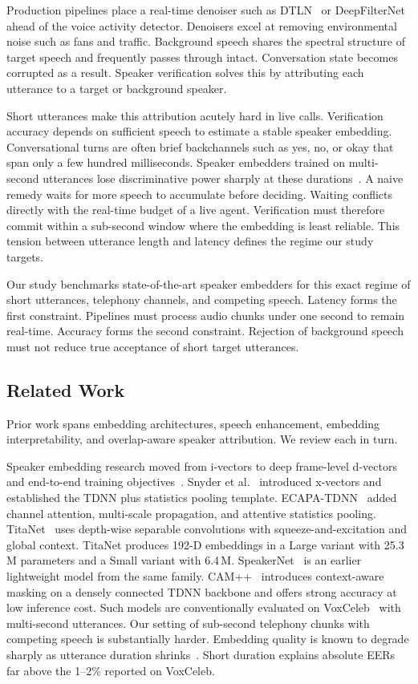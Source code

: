 \documentclass{llncs}
\begin{document}
Production pipelines place a real-time denoiser such as DTLN~\cite{dtln} or DeepFilterNet~\cite{dfn} ahead of the voice activity detector. Denoisers excel at removing environmental noise such as fans and traffic. Background speech shares the spectral structure of target speech and frequently passes through intact. Conversation state becomes corrupted as a result. Speaker verification solves this by attributing each utterance to a target or background speaker.

Short utterances make this attribution acutely hard in live calls. Verification accuracy depends on sufficient speech to estimate a stable speaker embedding. Conversational turns are often brief backchannels such as yes, no, or okay that span only a few hundred milliseconds. Speaker embedders trained on multi-second utterances lose discriminative power sharply at these durations~\cite{poddar2018}. A naive remedy waits for more speech to accumulate before deciding. Waiting conflicts directly with the real-time budget of a live agent. Verification must therefore commit within a sub-second window where the embedding is least reliable. This tension between utterance length and latency defines the regime our study targets.

Our study benchmarks state-of-the-art speaker embedders for this exact regime of short utterances, telephony channels, and competing speech. Latency forms the first constraint. Pipelines must process audio chunks under one second to remain real-time. Accuracy forms the second constraint. Rejection of background speech must not reduce true acceptance of short target utterances.

\subsection{Related Work}
Prior work spans embedding architectures, speech enhancement, embedding interpretability, and overlap-aware speaker attribution. We review each in turn.

Speaker embedding research moved from i-vectors to deep frame-level d-vectors~\cite{dvector} and end-to-end training objectives~\cite{ge2e}. Snyder et al.~\cite{xvec} introduced x-vectors and established the TDNN plus statistics pooling template. ECAPA-TDNN~\cite{ecapa} added channel attention, multi-scale propagation, and attentive statistics pooling. TitaNet~\cite{titanet} uses depth-wise separable convolutions with squeeze-and-excitation and global context. TitaNet produces 192-D embeddings in a Large variant with 25.3\,M parameters and a Small variant with 6.4\,M. SpeakerNet~\cite{speakernet} is an earlier lightweight model from the same family. CAM++~\cite{campp} introduces context-aware masking on a densely connected TDNN backbone and offers strong accuracy at low inference cost. Such models are conventionally evaluated on VoxCeleb~\cite{voxceleb,voxceleb2} with multi-second utterances. Our setting of sub-second telephony chunks with competing speech is substantially harder. Embedding quality is known to degrade sharply as utterance duration shrinks~\cite{poddar2018}. Short duration explains absolute EERs far above the 1--2\% reported on VoxCeleb.
\end{document}
